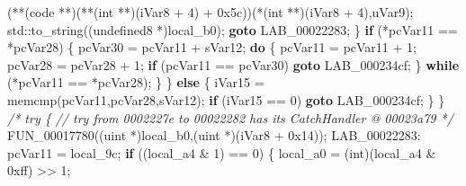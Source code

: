 \documentclass[
]{article}
\newenvironment{Shaded}{}{}
\newcommand{\BaseNTok}[1]{\textcolor[rgb]{0.25,0.63,0.44}{#1}}
\newcommand{\CommentTok}[1]{\textcolor[rgb]{0.38,0.63,0.69}{\textit{#1}}}
\newcommand{\ControlFlowTok}[1]{\textcolor[rgb]{0.00,0.44,0.13}{\textbf{#1}}}
\newcommand{\DataTypeTok}[1]{\textcolor[rgb]{0.56,0.13,0.00}{#1}}
\newcommand{\DecValTok}[1]{\textcolor[rgb]{0.25,0.63,0.44}{#1}}
\newcommand{\NormalTok}[1]{#1}
\newcommand{\OperatorTok}[1]{\textcolor[rgb]{0.40,0.40,0.40}{#1}}
\begin{document}
\begin{Shaded}
\begin{Highlighting}[]
        \OperatorTok{(**(}\NormalTok{code }\OperatorTok{**)(**(}\DataTypeTok{int} \OperatorTok{**)(}\NormalTok{iVar8 }\OperatorTok{+} \DecValTok{4}\OperatorTok{)} \OperatorTok{+} \BaseNTok{0x5c}\OperatorTok{))(*(}\DataTypeTok{int} \OperatorTok{**)(}\NormalTok{iVar8 }\OperatorTok{+} \DecValTok{4}\OperatorTok{),}\NormalTok{uVar9}\OperatorTok{);}
\NormalTok{        std}\OperatorTok{::}\NormalTok{to\_string}\OperatorTok{((}\NormalTok{undefined8 }\OperatorTok{*)}\NormalTok{local\_b0}\OperatorTok{);}
        \ControlFlowTok{goto}\NormalTok{ LAB\_00022283}\OperatorTok{;}
      \OperatorTok{\}}
      \ControlFlowTok{if} \OperatorTok{(*}\NormalTok{pcVar11 }\OperatorTok{==} \OperatorTok{*}\NormalTok{pcVar28}\OperatorTok{)} \OperatorTok{\{}
\NormalTok{        pcVar30 }\OperatorTok{=}\NormalTok{ pcVar11 }\OperatorTok{+}\NormalTok{ sVar12}\OperatorTok{;}
        \ControlFlowTok{do} \OperatorTok{\{}
\NormalTok{          pcVar11 }\OperatorTok{=}\NormalTok{ pcVar11 }\OperatorTok{+} \DecValTok{1}\OperatorTok{;}
\NormalTok{          pcVar28 }\OperatorTok{=}\NormalTok{ pcVar28 }\OperatorTok{+} \DecValTok{1}\OperatorTok{;}
          \ControlFlowTok{if} \OperatorTok{(}\NormalTok{pcVar11 }\OperatorTok{==}\NormalTok{ pcVar30}\OperatorTok{)} \ControlFlowTok{goto}\NormalTok{ LAB\_000234cf}\OperatorTok{;}
        \OperatorTok{\}} \ControlFlowTok{while} \OperatorTok{(*}\NormalTok{pcVar11 }\OperatorTok{==} \OperatorTok{*}\NormalTok{pcVar28}\OperatorTok{);}
      \OperatorTok{\}}
    \OperatorTok{\}}
    \ControlFlowTok{else} \OperatorTok{\{}
\NormalTok{      iVar15 }\OperatorTok{=}\NormalTok{ memcmp}\OperatorTok{(}\NormalTok{pcVar11}\OperatorTok{,}\NormalTok{pcVar28}\OperatorTok{,}\NormalTok{sVar12}\OperatorTok{);}
      \ControlFlowTok{if} \OperatorTok{(}\NormalTok{iVar15 }\OperatorTok{==} \DecValTok{0}\OperatorTok{)} \ControlFlowTok{goto}\NormalTok{ LAB\_000234cf}\OperatorTok{;}
    \OperatorTok{\}}
  \OperatorTok{\}}
                    \CommentTok{/* try \{ // try from 0002227e to 00022282 has its CatchHandler @ 00023a79 */}
\NormalTok{  FUN\_00017780}\OperatorTok{((}\NormalTok{uint }\OperatorTok{*)}\NormalTok{local\_b0}\OperatorTok{,(}\NormalTok{uint }\OperatorTok{*)(}\NormalTok{iVar8 }\OperatorTok{+} \BaseNTok{0x14}\OperatorTok{));}
\NormalTok{LAB\_00022283}\OperatorTok{:}
\NormalTok{  pcVar11 }\OperatorTok{=}\NormalTok{ local\_9c}\OperatorTok{;}
  \ControlFlowTok{if} \OperatorTok{((}\NormalTok{local\_a4 }\OperatorTok{\&} \DecValTok{1}\OperatorTok{)} \OperatorTok{==} \DecValTok{0}\OperatorTok{)} \OperatorTok{\{}
\NormalTok{    local\_a0 }\OperatorTok{=} \OperatorTok{(}\DataTypeTok{int}\OperatorTok{)(}\NormalTok{local\_a4 }\OperatorTok{\&} \BaseNTok{0xff}\OperatorTok{)} \OperatorTok{\textgreater{}\textgreater{}} \DecValTok{1}\OperatorTok{;}

\end{Highlighting}
\end{Shaded}
\end{document}
